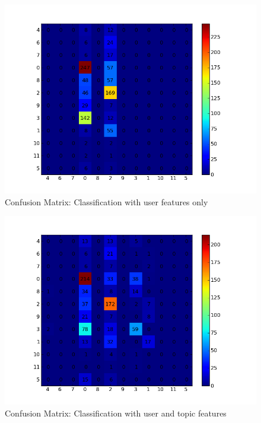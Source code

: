 \begin{figure}[H]
	\centering
	\includegraphics[scale=0.35]{Figures/no_topic_features_confusion.png}
	\caption{Confusion Matrix: Classification with user features only}
	\label{fig:useronlyconfusion}
\end{figure}

\begin{figure}[H]
	\centering
	\includegraphics[scale=0.35]{Figures/boydstun_confusion.png}
	\caption{Confusion Matrix: Classification with user and topic features}
	\label{fig:boydstunconfusion}
\end{figure}



